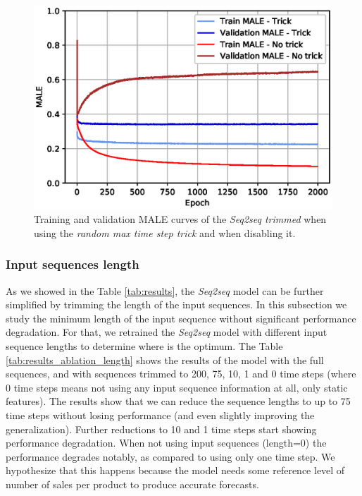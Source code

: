 \begin{figure}[h!]
	\centering
	\includegraphics[width=0.7\linewidth]{salesforecast/images/train_curves_notrick}
	\caption{Training and validation MALE curves of the \textit{Seq2seq trimmed} when using the \textit{random max time step trick} and when disabling it.}
	\label{fig:traincurvesnotrick}
\end{figure}

\subsubsection{Input sequences length}
As we showed in the Table \ref{tab:results}, the \textit{Seq2seq} model can be further simplified by trimming the length of the input sequences. In this subsection we study the minimum length of the input sequence without significant performance degradation. For that, we retrained the \textit{Seq2seq} model with different input sequence lengths to determine where is the optimum. The Table 		\ref{tab:results_ablation_length} shows the results of the model with the full sequences, and with sequences trimmed to 200, 75, 10, 1 and 0 time steps (where 0 time steps means not using any input sequence information at all, only static features). The results show that we can reduce the sequence lengths to up to 75 time steps without losing performance (and even slightly improving the generalization). Further reductions to 10 and 1 time steps start showing performance degradation. When not using input sequences (length=0) the performance degrades notably, as compared to using only one time step. We hypothesize that this happens because the model needs some reference level of number of sales per product to produce accurate forecasts. 

